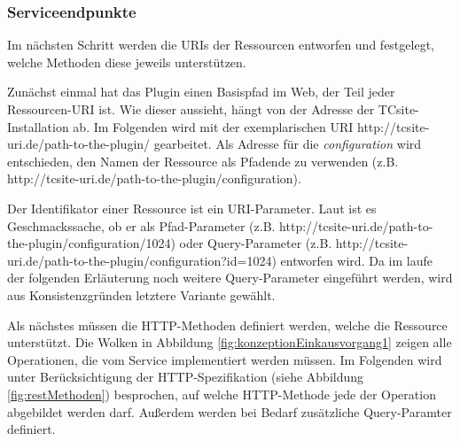 \documentclass[11pt, a4paper, titlepage, listof=totoc, bibliography=totoc, index=totoc, twoside, openright, headings=normal]{scrreprt}
\begin{document}
\subsubsection{Serviceendpunkte}
Im nächsten Schritt werden die URIs der Ressourcen entworfen und festgelegt, welche Methoden diese jeweils unterstützen.

Zunächst einmal hat das Plugin einen Basispfad im Web, der Teil jeder Ressourcen-URI ist. Wie dieser aussieht, hängt von der Adresse der TCsite-Installation ab. Im Folgenden wird mit der exemplarischen URI \glqq http://tcsite-uri.de/path-to-the-plugin/\grqq{} gearbeitet. Als Adresse für die \emph{configuration} wird entschieden, den Namen der Ressource als Pfadende zu verwenden (z.B. \glqq http://tcsite-uri.de/path-to-the-plugin/configuration\grqq{}).

Der Identifikator einer Ressource ist ein URI-Parameter. Laut \citet{tilkov11} ist es Geschmackssache, ob er als Pfad-Parameter (z.B. \glqq http://tcsite-uri.de/path-to-the-plugin/configuration/1024\grqq{}) oder Query-Parameter (z.B. \glqq http://tcsite-uri.de/path-to-the-plugin/configuration?id=1024\grqq{}) entworfen wird. Da im laufe der folgenden Erläuterung noch weitere Query-Parameter eingeführt werden, wird aus Konsistenzgründen letztere Variante gewählt.

Als nächstes müssen die HTTP-Methoden definiert werden, welche die Ressource unterstützt. Die Wolken in Abbildung \ref{fig:konzeptionEinkausvorgang1} zeigen alle Operationen, die vom Service implementiert werden müssen. Im Folgenden wird unter Berücksichtigung der HTTP-Spezifikation (siehe Abbildung \ref{fig:restMethoden}) besprochen, auf welche HTTP-Methode jede der Operation abgebildet werden darf. Außerdem werden bei Bedarf zusätzliche Query-Paramter definiert.
\end{document}
